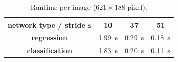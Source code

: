 \begin{table}[]
    \begin{center}
        \begin{tabular}{c|ccc}
            \toprule
            \textbf{network type / stride $\bm{s}$} & 10 & 37 & 51 \\
            \midrule
            \textbf{regression}     & \SI{1.99}{\second} & \SI{0.29}{\second} & \SI{0.18}{\second} \\
            \textbf{classification} & \SI{1.83}{\second} & \SI{0.20}{\second}  & \SI{0.11}{\second}\\
            \bottomrule
        \end{tabular}
        \caption{Runtime per image ($621 \times 188$ pixel).}
        \label{tab:runtime}
    \end{center}
\end{table}

